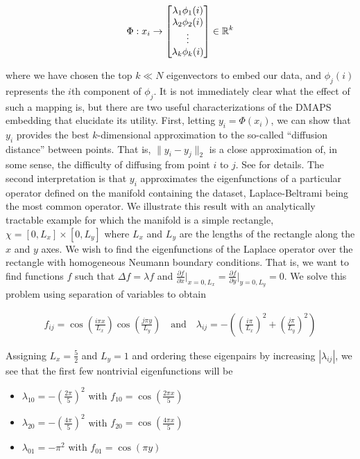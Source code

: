 \begin{align*}
  \Phi: x_i \rightarrow \begin{bmatrix} \lambda_1 \phi_1(i) \\ \lambda_2
    \phi_2(i) \\ \vdots \\ \lambda_k \phi_k(i) \end{bmatrix} \in \mathbb{R}^k
\end{align*}

where we have chosen the top $k \ll N$ eigenvectors to embed our data,
and $\phi_j(i)$ represents the $i$th component of $\phi_j$. It is not
immediately clear what the effect of such a mapping is, but there are
two useful characterizations of the DMAPS embedding that elucidate its
utility. First, letting $y_i = \Phi(x_i)$, we can show that $y_i$
provides the best $k$-dimensional approximation to the so-called
``diffusion distance'' between points. That is, $\| y_i - y_j \|_2$ is
a close approximation of, in some sense, the difficulty of diffusing
from point $i$ to $j$. See \cite{lafon_diffusion_2006} for details. The second
interpretation is that $y_i$ approximates the eigenfunctions of a
particular operator defined on the manifold containing the dataset,
Laplace-Beltrami being the most common operator. We illustrate this
result with an analytically tractable example for which
the manifold is a simple rectangle, $\chi = [0, L_x] \times [0, L_y]$
where $L_x$ and $L_y$ are the lengths of the rectangle along the $x$
and $y$ axes. We wish to find the eigenfunctions of the Laplace
operator over the rectangle with homogeneous Neumann boundary
conditions. That is, we want to find functions $f$ such that
$\Delta f = \lambda f$ and
$\frac{\partial f}{\partial x}\Big|_{x=0,L_x} =\frac{\partial
  f}{\partial y}\Big|_{y=0,L_y} = 0$. We solve this problem using
separation of variables to obtain

\begin{align*}
  f_{ij} = \cos\left(\frac{i \pi x}{L_x}\right) \cos\left(\frac{j \pi y}{L_y}\right) \quad
  \mathrm{and} \quad \lambda_{ij} = -\left( \left(\frac{i \pi
  }{L_x}\right)^2 + \left(\frac{j \pi}{L_y}\right)^2 \right)
\end{align*}

Assigning $L_x = \frac{5}{2}$ and $L_y = 1$ and ordering these eigenpairs by
increasing $|\lambda_{ij}|$, we see that the first few nontrivial eigenfunctions
will be

\begin{itemize}
\item $\lambda_{10} = -\left(\frac{2 \pi}{5}\right)^2$ with $f_{10} =
  \cos \left(\frac{2 \pi x}{5} \right)$
\item $\lambda_{20} = -\left(\frac{4 \pi}{5}\right)^2$ with $f_{20} =
  \cos \left(\frac{4 \pi x}{5} \right)$
\item $\lambda_{01} = -\pi^2$ with $f_{01} =
  \cos \left( \pi y \right)$
\end{itemize}

